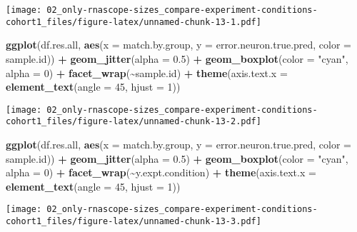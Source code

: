 \documentclass[
]{article}
\newenvironment{Shaded}{\begin{snugshade}}{\end{snugshade}}
\newcommand{\AttributeTok}[1]{\textcolor[rgb]{0.13,0.29,0.53}{#1}}
\newcommand{\DecValTok}[1]{\textcolor[rgb]{0.00,0.00,0.81}{#1}}
\newcommand{\FloatTok}[1]{\textcolor[rgb]{0.00,0.00,0.81}{#1}}
\newcommand{\FunctionTok}[1]{\textcolor[rgb]{0.13,0.29,0.53}{\textbf{#1}}}
\newcommand{\NormalTok}[1]{#1}
\newcommand{\SpecialCharTok}[1]{\textcolor[rgb]{0.81,0.36,0.00}{\textbf{#1}}}
\newcommand{\StringTok}[1]{\textcolor[rgb]{0.31,0.60,0.02}{#1}}
\begin{document}
\texttt{[image: 02\_only-rnascope-sizes\_compare-experiment-conditions-cohort1\_files/figure-latex/unnamed-chunk-13-1.pdf]}

\begin{Shaded}
\begin{Highlighting}[]
\FunctionTok{ggplot}\NormalTok{(df.res.all, }\FunctionTok{aes}\NormalTok{(}\AttributeTok{x =}\NormalTok{ match.by.group, }\AttributeTok{y =}\NormalTok{ error.neuron.true.pred, }\AttributeTok{color =}\NormalTok{ sample.id)) }\SpecialCharTok{+} 
  \FunctionTok{geom\_jitter}\NormalTok{(}\AttributeTok{alpha =} \FloatTok{0.5}\NormalTok{) }\SpecialCharTok{+} \FunctionTok{geom\_boxplot}\NormalTok{(}\AttributeTok{color =} \StringTok{"cyan"}\NormalTok{, }\AttributeTok{alpha =} \DecValTok{0}\NormalTok{) }\SpecialCharTok{+} \FunctionTok{facet\_wrap}\NormalTok{(}\SpecialCharTok{\textasciitilde{}}\NormalTok{sample.id) }\SpecialCharTok{+}
  \FunctionTok{theme}\NormalTok{(}\AttributeTok{axis.text.x =} \FunctionTok{element\_text}\NormalTok{(}\AttributeTok{angle =} \DecValTok{45}\NormalTok{, }\AttributeTok{hjust =} \DecValTok{1}\NormalTok{))}
\end{Highlighting}
\end{Shaded}

\texttt{[image: 02\_only-rnascope-sizes\_compare-experiment-conditions-cohort1\_files/figure-latex/unnamed-chunk-13-2.pdf]}

\begin{Shaded}
\begin{Highlighting}[]
\FunctionTok{ggplot}\NormalTok{(df.res.all, }\FunctionTok{aes}\NormalTok{(}\AttributeTok{x =}\NormalTok{ match.by.group, }\AttributeTok{y =}\NormalTok{ error.neuron.true.pred, }\AttributeTok{color =}\NormalTok{ sample.id)) }\SpecialCharTok{+} 
  \FunctionTok{geom\_jitter}\NormalTok{(}\AttributeTok{alpha =} \FloatTok{0.5}\NormalTok{) }\SpecialCharTok{+} \FunctionTok{geom\_boxplot}\NormalTok{(}\AttributeTok{color =} \StringTok{"cyan"}\NormalTok{, }\AttributeTok{alpha =} \DecValTok{0}\NormalTok{) }\SpecialCharTok{+} \FunctionTok{facet\_wrap}\NormalTok{(}\SpecialCharTok{\textasciitilde{}}\NormalTok{y.expt.condition) }\SpecialCharTok{+}
  \FunctionTok{theme}\NormalTok{(}\AttributeTok{axis.text.x =} \FunctionTok{element\_text}\NormalTok{(}\AttributeTok{angle =} \DecValTok{45}\NormalTok{, }\AttributeTok{hjust =} \DecValTok{1}\NormalTok{))}
\end{Highlighting}
\end{Shaded}

\texttt{[image: 02\_only-rnascope-sizes\_compare-experiment-conditions-cohort1\_files/figure-latex/unnamed-chunk-13-3.pdf]}
\end{document}
